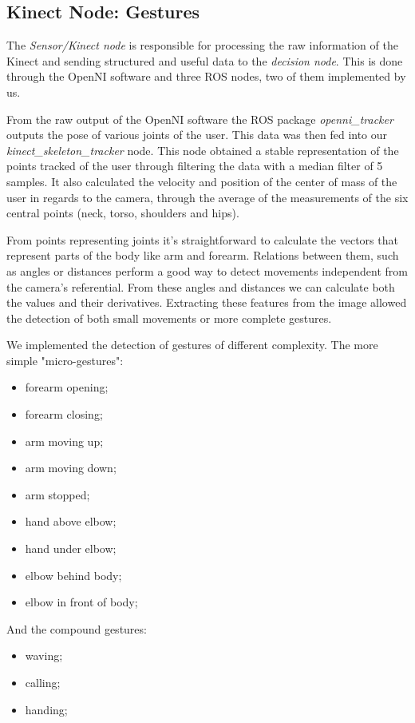 \subsection{Kinect Node: Gestures}

The \textit{Sensor/Kinect node} is responsible for processing the raw information of the Kinect and sending structured and useful data to the \textit{decision node}. This is done through the OpenNI software and three ROS nodes, two of them implemented by us.  

From the raw output of the OpenNI software the ROS package \textit{openni\_tracker} outputs the pose of various joints of the user. This data was then fed into our \textit{kinect\_skeleton\_tracker} node. This node obtained a stable representation of the points tracked of the user through filtering the data with a median filter of 5 samples. It also calculated the velocity and position of the center of mass of the user in regards to the camera, through the average of the measurements of the six central points (neck, torso, shoulders and hips). 

From points representing joints it's straightforward to calculate the vectors that represent parts of the body like arm and forearm. Relations between them, such as angles or distances perform a good way to detect movements independent from the camera's referential.
From these angles and distances we can calculate both the values and their derivatives. Extracting these features from the image allowed the detection of both small movements or more complete gestures.

We implemented the detection of gestures of different complexity. The more simple "micro-gestures":

\begin{itemize}
\item forearm opening;
\item forearm closing;
\item arm moving up;
\item arm moving down;
\item arm stopped;
\item hand above elbow;
\item hand under elbow;
\item elbow behind body;
\item elbow in front of body;
\end{itemize}

And the compound gestures:
\begin{itemize}
\item waving;
\item calling;
\item handing;
\end{itemize}

